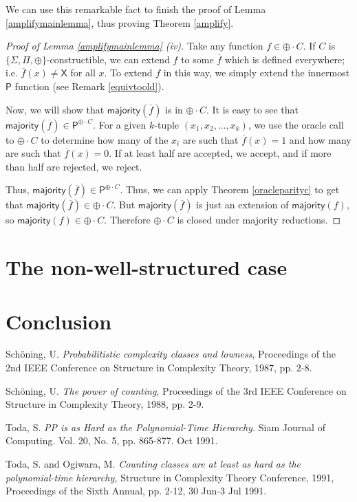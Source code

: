 \documentclass[11pt]{article}
\newcommand{\parity}{\oplus}
\newcommand{\p}{\textsf{P}}
\newcommand{\x}{\textsf{X}}
\newcommand{\majority}{\textsf{majority}}
\begin{document}
We can use this remarkable fact to finish the proof of Lemma \ref{amplifymainlemma}, thus proving Theorem \ref{amplify}.
\begin{proof}[Proof of Lemma \ref{amplifymainlemma} (iv)]
Take any function $f \in \parity \cdot C$. If $C$ is $\{\Sigma, \Pi, \parity\}$-constructible, we can extend $f$ to some $\overline{f}$ which is defined everywhere; i.e. $\overline{f}(x) \ne \x$ for all $x$. To extend $f$ in this way, we simply extend the innermost $\p$ function (see Remark \ref{equivtoold}).

Now, we will show that $\majority(\overline{f})$ is in $\parity \cdot C$. It is easy to see that $\majority(\overline{f}) \in \p^{\parity \cdot C}$. For a given $k$-tuple $(x_1,x_2,...,x_k)$, we use the oracle call to $\parity \cdot C$ to determine how many of the $x_i$ are such that $\overline{f}(x) = 1$ and how many are such that $\overline{f}(x) = 0$. If at least half are accepted, we accept, and if more than half are rejected, we reject.

Thus, $\majority(\overline{f}) \in \p^{\parity \cdot C}$. Thus, we can apply Theorem \ref{oracleparityc} to get that $\majority(\overline{f}) \in \parity \cdot C$. But $\majority(\overline{f})$ is just an extension of $\majority(f)$, so $\majority(f) \in \parity \cdot C$. Therefore $\parity \cdot C$ is closed under majority reductions.
\end{proof}

\section{The non-well-structured case}\label{notwellstruct}

\section{Conclusion}

\pagebreak

\begin{thebibliography}{9}


 Sch\"oning, U. \emph{Probabilitistic complexity classes and lowness}, Proceedings of the 2nd IEEE Conference on Structure in Complexity Theory, 1987, pp. 2-8.

 Sch\"oning, U. \emph{The power of counting}, Proceedings of the 3rd IEEE Conference on Structure in Complexity Theory, 1988, pp. 2-9.

Toda, S. \emph{PP is as Hard as the Polynomial-Time Hierarchy.} Siam Journal of Computing. Vol. 20, No. 5, pp. 865-877. Oct 1991.

 Toda, S. and Ogiwara, M. \emph{Counting classes are at least as hard as the polynomial-time hierarchy,} Structure in Complexity Theory Conference, 1991, Proceedings of the Sixth Annual, pp. 2-12, 30 Jun-3 Jul 1991.

\end{thebibliography}
\end{document}
